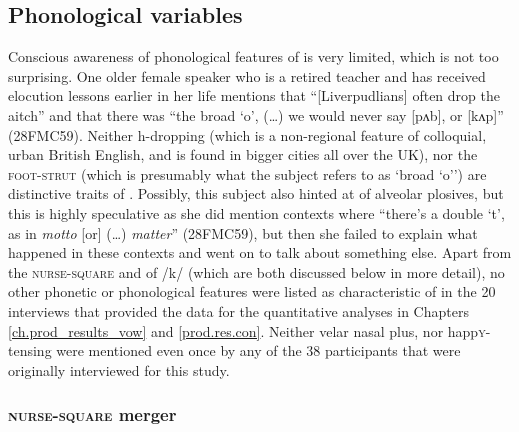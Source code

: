 \subsection{Phonological variables}
\label{aware_res.phon}

Conscious awareness of phonological features of  is very limited, which is not too surprising.
One older female speaker who is a retired teacher and has received elocution lessons earlier in her life mentions that ``[Liverpudlians] often drop the aitch'' and that there was ``the broad `o', (\ldots) we would never say [pʌb], or [kʌp]'' (28FMC59).
Neither h-dropping (which is a non-regional feature of colloquial, urban British English, and is found in bigger cities all over the UK), nor the \textsc{foot}-\textsc{strut}  (which is presumably what the subject refers to as `broad `o'') are distinctive traits of .
Possibly, this subject also hinted at  of alveolar plosives, but this is highly speculative as she did mention contexts where ``there's a double `t', as in \emph{motto} [or] (\ldots) \emph{matter}'' (28FMC59), but then she failed to explain what happened in these contexts and went on to talk about something else.
Apart from the \textsc{nurse}-\textsc{square}  and  of /k/ (which are both discussed below in more detail), no other phonetic or phonological features were listed as characteristic of  in the 20 interviews that provided the data for the quantitative analyses in Chapters \ref{ch.prod_results_vow} and \ref{prod.res.con}.
Neither velar nasal plus, nor happ\textsc{y}-tensing were mentioned even once by any of the 38 participants that were originally interviewed for this study.

\subsubsection{\textsc{nurse}-\textsc{square} merger}
\label{aware_res.phon.nurse}

